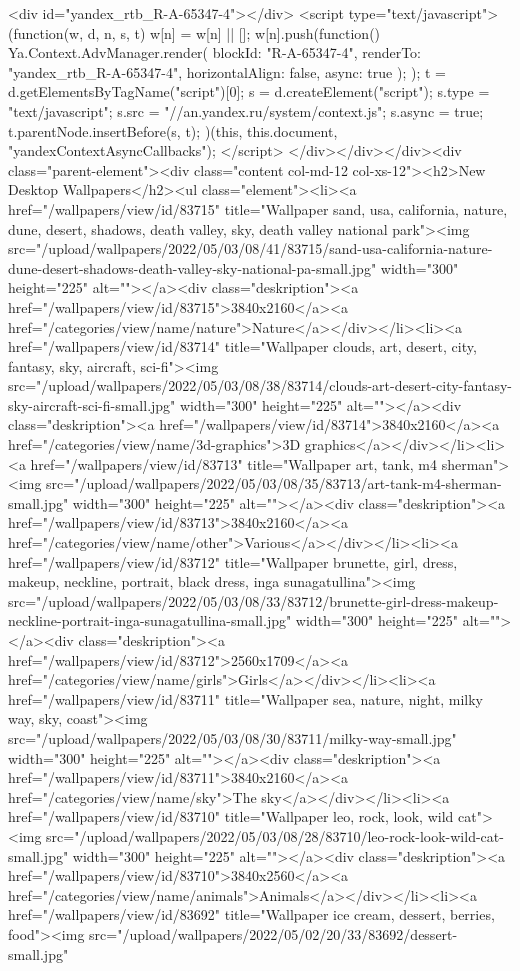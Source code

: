 <div id="yandex_rtb_R-A-65347-4"></div>
<script type="text/javascript">
    (function(w, d, n, s, t) {
        w[n] = w[n] || [];
        w[n].push(function() {
            Ya.Context.AdvManager.render({
                blockId: "R-A-65347-4",
                renderTo: "yandex_rtb_R-A-65347-4",
                horizontalAlign: false,
                async: true
            });
        });
        t = d.getElementsByTagName("script")[0];
        s = d.createElement("script");
        s.type = "text/javascript";
        s.src = "//an.yandex.ru/system/context.js";
        s.async = true;
        t.parentNode.insertBefore(s, t);
    })(this, this.document, "yandexContextAsyncCallbacks");
</script> </div></div></div><div class="parent-element"><div class="content col-md-12 col-xs-12"><h2>New Desktop Wallpapers</h2><ul class="element"><li><a href="/wallpapers/view/id/83715" title="Wallpaper sand, usa, california, nature, dune, desert, shadows, death valley, sky, death valley national park"><img src="/upload/wallpapers/2022/05/03/08/41/83715/sand-usa-california-nature-dune-desert-shadows-death-valley-sky-national-pa-small.jpg" width="300" height="225" alt=""></a><div class="deskription"><a href="/wallpapers/view/id/83715">3840x2160</a><a href="/categories/view/name/nature">Nature</a></div></li><li><a href="/wallpapers/view/id/83714" title="Wallpaper clouds, art, desert, city, fantasy, sky, aircraft, sci-fi"><img src="/upload/wallpapers/2022/05/03/08/38/83714/clouds-art-desert-city-fantasy-sky-aircraft-sci-fi-small.jpg" width="300" height="225" alt=""></a><div class="deskription"><a href="/wallpapers/view/id/83714">3840x2160</a><a href="/categories/view/name/3d-graphics">3D graphics</a></div></li><li><a href="/wallpapers/view/id/83713" title="Wallpaper art, tank, m4 sherman"><img src="/upload/wallpapers/2022/05/03/08/35/83713/art-tank-m4-sherman-small.jpg" width="300" height="225" alt=""></a><div class="deskription"><a href="/wallpapers/view/id/83713">3840x2160</a><a href="/categories/view/name/other">Various</a></div></li><li><a href="/wallpapers/view/id/83712" title="Wallpaper brunette, girl, dress, makeup, neckline, portrait, black dress, inga sunagatullina"><img src="/upload/wallpapers/2022/05/03/08/33/83712/brunette-girl-dress-makeup-neckline-portrait-inga-sunagatullina-small.jpg" width="300" height="225" alt=""></a><div class="deskription"><a href="/wallpapers/view/id/83712">2560x1709</a><a href="/categories/view/name/girls">Girls</a></div></li><li><a href="/wallpapers/view/id/83711" title="Wallpaper sea, nature, night, milky way, sky, coast"><img src="/upload/wallpapers/2022/05/03/08/30/83711/milky-way-small.jpg" width="300" height="225" alt=""></a><div class="deskription"><a href="/wallpapers/view/id/83711">3840x2160</a><a href="/categories/view/name/sky">The sky</a></div></li><li><a href="/wallpapers/view/id/83710" title="Wallpaper leo, rock, look, wild cat"><img src="/upload/wallpapers/2022/05/03/08/28/83710/leo-rock-look-wild-cat-small.jpg" width="300" height="225" alt=""></a><div class="deskription"><a href="/wallpapers/view/id/83710">3840x2560</a><a href="/categories/view/name/animals">Animals</a></div></li><li><a href="/wallpapers/view/id/83692" title="Wallpaper ice cream, dessert, berries, food"><img src="/upload/wallpapers/2022/05/02/20/33/83692/dessert-small.jpg" 